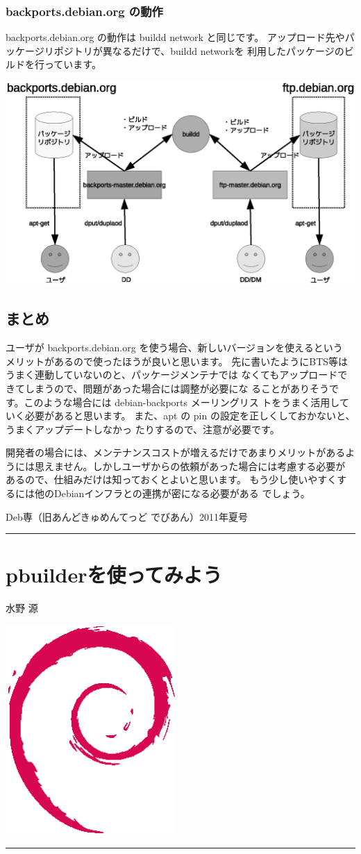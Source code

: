 \documentclass[mingoth,a4paper]{jsarticle}
\renewcommand{\dancersection}[2]{%
\newpage
Deb専（旧あんどきゅめんてっど でびあん）2011年夏号
%
\vspace{0.1mm}\\
{\color{dancerdarkblue}\rule{\hsize}{2mm}}

%
%
\begin{minipage}[t]{0.6\hsize}
\color{dancerdarkblue}
\vspace{1cm}
\section{#1}
\hfill{}#2\\
\end{minipage}
\begin{minipage}[t]{0.4\hsize}
\vspace{-2cm}
\hfill{}\includegraphics[height=8cm]{image200502/openlogo-nd.eps}\\
\vspace{-5cm}
\end{minipage}
%
{\color{dancerlightblue}\rule{0.66\hsize}{2mm}}
%
\vspace{2cm}
}
\begin{document}
\subsubsection{backports.debian.org の動作}
backports.debian.org の動作は buildd network と同じです。
アップロード先やパッケージリポジトリが異なるだけで、buildd networkを
利用したパッケージのビルドを行っています。

\begin{center}
\includegraphics[width=15cm]{image201104/backports-buildd_mono.eps}
\end{center}

\subsection{まとめ}
ユーザが backports.debian.org を使う場合、新しいバージョンを使えるという
メリットがあるので使ったほうが良いと思います。
先に書いたようにBTS等はうまく連動していないのと、パッケージメンテナでは
なくてもアップロードできてしまうので、問題があった場合には調整が必要にな
ることがありそうです。このような場合には debian-backports メーリングリス
トをうまく活用していく必要があると思います。
また、apt の pin の設定を正しくしておかないと、うまくアップデートしなかっ
たりするので、注意が必要です。

開発者の場合には、メンテナンスコストが増えるだけであまりメリットがあるよ
うには思えません。しかしユーザからの依頼があった場合には考慮する必要が
あるので、仕組みだけは知っておくとよいと思います。
もう少し使いやすくするには他のDebianインフラとの連携が密になる必要がある
でしょう。

\dancersection{pbuilderを使ってみよう}{水野 源}
\end{document}
